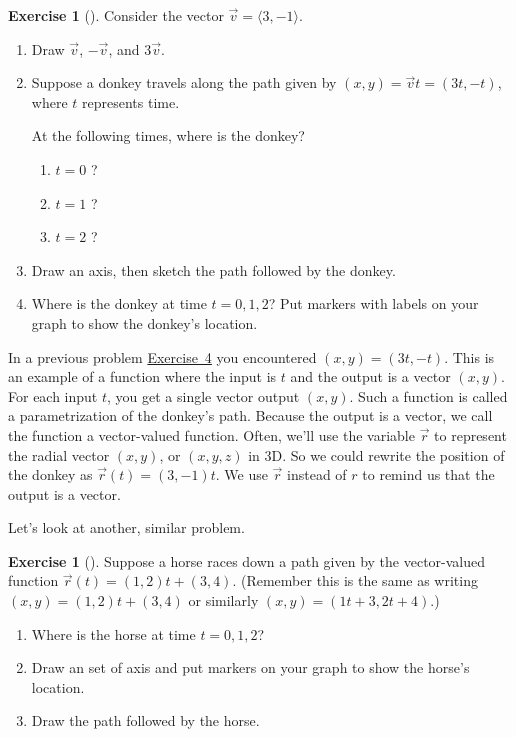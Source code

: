 \documentclass[10pt,]{book}
\theoremstyle{plain}
\theoremstyle{definition}
\theoremstyle{definition}
\theoremstyle{definition}
\theoremstyle{definition}
\newtheorem{exploration}[project]{Exercise}
\theoremstyle{definition}
\numberwithin{equation}{section}
\begin{document}
\begin{exploration}[]\label{prob_donkey}
Consider the vector \(\vec v=\langle 3,-1 \rangle\).%
\begin{enumerate}[font=\bfseries,label=(\alph*),ref=\alph*]
\item\label{task-33} Draw \(\vec v\), \(-\vec v\), and \(3\vec v\).%
\item\label{task-34} Suppose a donkey travels along the path given by \((x,y)=\vec v t = (3t,-t)\), where \(t\) represents time.%
\par
At the following times, where is the donkey?%
\begin{enumerate}[font=\bfseries,label=(\roman*),ref=\theenumi.\roman*]
\item\label{task-35} \(t=0\) ?%
\item\label{task-36} \(t=1\) ?%
\item\label{task-37} \(t=2\) ?%
\end{enumerate}
\item\label{task-38} Draw an axis, then sketch the path followed by the donkey.%
\item\label{task-39} Where is the donkey at time \(t=0,1,2\)? Put markers with labels on your graph to show the donkey's location.%
\end{enumerate}
\end{exploration}
In a previous problem \hyperref[prob_donkey]{Exercise~4} you encountered \((x,y)=(3t,-t)\). This is an example of a function where the input is \(t\) and the output is a vector \((x,y)\). For each input \(t\), you get a single vector output \((x,y)\). Such a function is called a parametrization of the donkey's path. Because the output is a vector, we call the function a vector-valued function. Often, we'll use the variable \(\vec r\) to represent the radial vector \((x,y)\), or \((x,y,z)\) in 3D. So we could rewrite the position of the donkey as \(\vec r(t)=(3,-1)t\). We use \(\vec r\) instead of \(r\) to remind us that the output is a vector.%
\par
Let's look at another, similar problem.%
\begin{exploration}[]\label{prob_horseline}
Suppose a horse races down a path given by the vector-valued function \(\vec r(t) = (1,2)t+(3,4)\). (Remember this is the same as writing \((x,y) =  (1,2)t+(3,4)\) or similarly \((x,y)=(1t+3,2t+4)\).)%
\begin{enumerate}[font=\bfseries,label=(\alph*),ref=\alph*]
\item\label{task-40} Where is the horse at time \(t=0,1,2\)?%
\item\label{task-41} Draw an set of axis and put markers on your graph to show the horse's location.%
\item\label{task-42} Draw the path followed by the horse.%
\end{enumerate}
\end{exploration}
\end{document}
